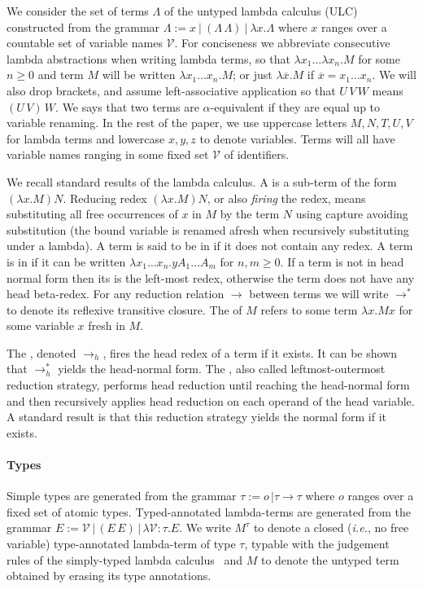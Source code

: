 \documentclass{elsarticle}
\makeatletter
\theoremstyle{plain}
\theoremstyle{definition}
\newcommand\VarSet{\mathcal{V}}
\renewcommand\ie{{\it i.e.\@\xspace}}
\makeatother
\begin{document}
We consider the set of terms $\Lambda$ of the untyped lambda calculus (ULC) constructed from the grammar $\Lambda := x\ |\ (\Lambda\, \Lambda)\ |\ \lambda x. \Lambda $
where $x$ ranges over a countable set of variable names $\VarSet$.
For conciseness we abbreviate consecutive lambda abstractions when writing lambda terms, so that $\lambda x_1 \ldots \lambda x_n . M$ for some $n\geq 0$ and term $M$ will be written $\lambda x_1 \ldots x_n . M$; or just
$\lambda \overline{x} . M$ if $\overline{x} = x_1 \ldots x_n$.
We will also drop brackets, and assume left-associative application so that $U\,V\,W$ means $(U\,V)\,W$. We says that  two terms are $\alpha$-equivalent if they are equal up to variable renaming.
In the rest of the paper, we use uppercase letters $M, N, T, U, V$ for lambda terms and lowercase $x,y,z$ to denote variables. Terms will all have variable names ranging in some fixed set $\VarSet$ of identifiers.

We recall standard results of the lambda calculus.
A  is a sub-term of the form $(\lambda x. M) N$.
Reducing redex $(\lambda x. M) N$, or also \emph{firing} the redex, means substituting all free occurrences of $x$ in $M$ by the term $N$ using capture avoiding substitution (the bound variable is renamed afresh when recursively substituting under a lambda).
A term is said to be in  if it does not contain any redex.
A term is in  if it can be written $\lambda x_1 \ldots x_n . y A_1 \ldots A_m$ for $n,m\geq0$. If a term is not in head normal form then its  is the left-most redex, otherwise the term does not have any head beta-redex. For any reduction relation $\rightarrow$ between terms we will write $\rightarrow^*$ to denote its reflexive transitive closure. The  of $M$ refers to some term $\lambda x. M x $ for some variable $x$ fresh in $M$.

The , denoted $\rightarrow_{h}$, fires the head redex of a term if it exists. It can be shown that $\rightarrow^*_{h}$ yields the head-normal form. The , also called leftmost-outermost reduction strategy, performs head reduction until reaching the head-normal form and then recursively applies head reduction on each operand of the head variable. A standard result is that this reduction strategy yields the normal form if it exists.

\paragraph{Types} Simple types are generated from the grammar $\tau := o\, | \tau \rightarrow \tau$ where $o$ ranges over a fixed set of atomic types. Typed-annotated lambda-terms are generated from the grammar $E := \VarSet\, |\, (E\, E)\, |\, \lambda \VarSet \colon\tau. E $.
We write $M^\tau$ to denote a closed (\ie, no free variable)
type-annotated lambda-term of type $\tau$, typable with the judgement rules of the simply-typed lambda calculus~\cite{Barendregt84} and $M$ to denote the untyped term obtained by erasing its type annotations.
\end{document}
